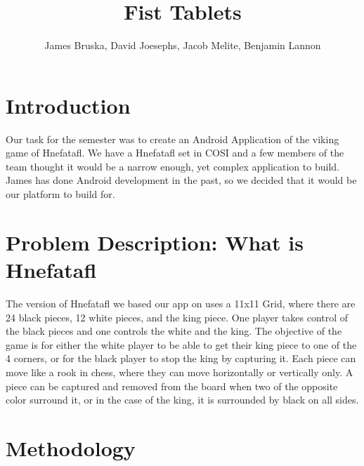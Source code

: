 \documentclass{article}
\title{Fist Tablets}
\author{James Bruska, David Joesephs, Jacob Melite, Benjamin Lannon}
\begin{document}
\maketitle
\tableofcontents


\section{Introduction}
	Our task for the semester was to create an Android Application of the viking game of Hnefatafl. We have a Hnefatafl set in COSI and a few members of the team thought it would be a narrow enough, yet complex application to build. James has done Android development in the past, so we decided that it would be our platform to build for.

\section{Problem Description: What is Hnefatafl}
The version of Hnefatafl we based our app on uses a 11x11 Grid, where there are 24 black pieces, 12 white pieces, and the king piece. One player takes control of the black pieces and one controls the white and the king. The objective of the game is for either the white player to be able to get their king piece to one of the 4 corners, or for the black player to stop the king by capturing it. Each piece can move like a rook in chess, where they can move horizontally or vertically only. A piece can be captured and removed from the board when two of the opposite color surround it, or in the case of the king, it is surrounded by black on all sides.

\section{Methodology}
\end{document}
